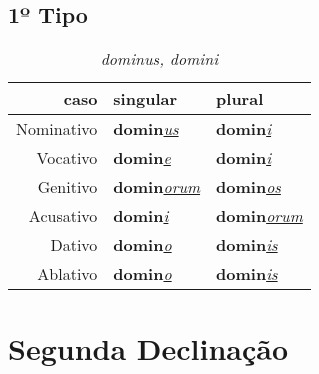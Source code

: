 \documentclass{article}
\newcommand{\radicaldesinencia}[2]{\textbf{#1}\textit{\underline{#2}}}
\begin{document}
\subsection*{1º Tipo}
\begin{table}[H]
\centering
\caption*{\textit{dominus, domini}}
\vspace{0.2cm}
\begin{tabular}{r|l|l}
\hline
caso			&	singular					& plural 						\\
\hline                                    		
\hline
Nominativo	&	\radicaldesinencia{domin}{us}	& \radicaldesinencia{domin}{i}	\\
Vocativo		&	\radicaldesinencia{domin}{e}	& \radicaldesinencia{domin}{i}	\\
Genitivo		&	\radicaldesinencia{domin}{orum}	& \radicaldesinencia{domin}{os}	\\
Acusativo	&	\radicaldesinencia{domin}{i}		& \radicaldesinencia{domin}{orum}	\\
Dativo		&	\radicaldesinencia{domin}{o}	& \radicaldesinencia{domin}{is}		\\
Ablativo		&	\radicaldesinencia{domin}{o}	& \radicaldesinencia{domin}{is}		\\


 \hline
\end{tabular}
\end{table}
\clearpage




\section*{Segunda Declinação}
\end{document}
